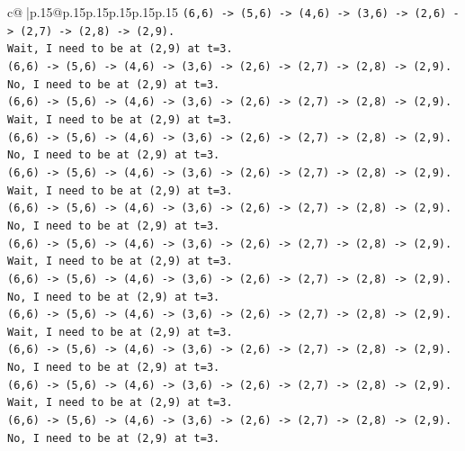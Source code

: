 \documentclass{article}
\begin{document}
{\begin{supertabular}{c@{$\;$}|p{.15\linewidth}@{}p{.15\linewidth}p{.15\linewidth}p{.15\linewidth}p{.15\linewidth}p{.15\linewidth}}
{{{\texttt{(6,6) {-}> (5,6) {-}> (4,6) {-}> (3,6) {-}> (2,6) {-}> (2,7) {-}> (2,8) {-}> (2,9).} \\
\texttt{Wait, I need to be at (2,9) at t=3.} \\
\texttt{(6,6) {-}> (5,6) {-}> (4,6) {-}> (3,6) {-}> (2,6) {-}> (2,7) {-}> (2,8) {-}> (2,9).} \\
\texttt{No, I need to be at (2,9) at t=3.} \\
\texttt{(6,6) {-}> (5,6) {-}> (4,6) {-}> (3,6) {-}> (2,6) {-}> (2,7) {-}> (2,8) {-}> (2,9).} \\
\texttt{Wait, I need to be at (2,9) at t=3.} \\
\texttt{(6,6) {-}> (5,6) {-}> (4,6) {-}> (3,6) {-}> (2,6) {-}> (2,7) {-}> (2,8) {-}> (2,9).} \\
\texttt{No, I need to be at (2,9) at t=3.} \\
\texttt{(6,6) {-}> (5,6) {-}> (4,6) {-}> (3,6) {-}> (2,6) {-}> (2,7) {-}> (2,8) {-}> (2,9).} \\
\texttt{Wait, I need to be at (2,9) at t=3.} \\
\texttt{(6,6) {-}> (5,6) {-}> (4,6) {-}> (3,6) {-}> (2,6) {-}> (2,7) {-}> (2,8) {-}> (2,9).} \\
\texttt{No, I need to be at (2,9) at t=3.} \\
\texttt{(6,6) {-}> (5,6) {-}> (4,6) {-}> (3,6) {-}> (2,6) {-}> (2,7) {-}> (2,8) {-}> (2,9).} \\
\texttt{Wait, I need to be at (2,9) at t=3.} \\
\texttt{(6,6) {-}> (5,6) {-}> (4,6) {-}> (3,6) {-}> (2,6) {-}> (2,7) {-}> (2,8) {-}> (2,9).} \\
\texttt{No, I need to be at (2,9) at t=3.} \\
\texttt{(6,6) {-}> (5,6) {-}> (4,6) {-}> (3,6) {-}> (2,6) {-}> (2,7) {-}> (2,8) {-}> (2,9).} \\
\texttt{Wait, I need to be at (2,9) at t=3.} \\
\texttt{(6,6) {-}> (5,6) {-}> (4,6) {-}> (3,6) {-}> (2,6) {-}> (2,7) {-}> (2,8) {-}> (2,9).} \\
\texttt{No, I need to be at (2,9) at t=3.} \\
\texttt{(6,6) {-}> (5,6) {-}> (4,6) {-}> (3,6) {-}> (2,6) {-}> (2,7) {-}> (2,8) {-}> (2,9).} \\
\texttt{Wait, I need to be at (2,9) at t=3.} \\
\texttt{(6,6) {-}> (5,6) {-}> (4,6) {-}> (3,6) {-}> (2,6) {-}> (2,7) {-}> (2,8) {-}> (2,9).} \\
\texttt{No, I need to be at (2,9) at t=3.} \\
}}}
\end{supertabular}}
\end{document}
